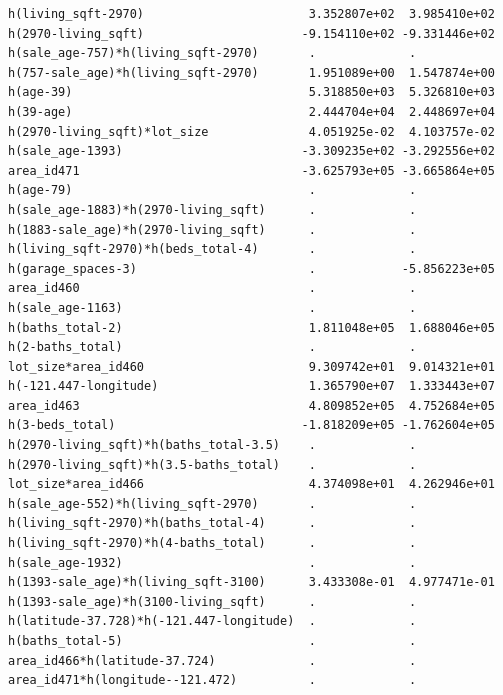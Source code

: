 \documentclass[
]{article}
\begin{document}
\begin{verbatim}
h(living_sqft-2970)                       3.352807e+02  3.985410e+02
h(2970-living_sqft)                      -9.154110e+02 -9.331446e+02
h(sale_age-757)*h(living_sqft-2970)       .             .           
h(757-sale_age)*h(living_sqft-2970)       1.951089e+00  1.547874e+00
h(age-39)                                 5.318850e+03  5.326810e+03
h(39-age)                                 2.444704e+04  2.448697e+04
h(2970-living_sqft)*lot_size              4.051925e-02  4.103757e-02
h(sale_age-1393)                         -3.309235e+02 -3.292556e+02
area_id471                               -3.625793e+05 -3.665864e+05
h(age-79)                                 .             .           
h(sale_age-1883)*h(2970-living_sqft)      .             .           
h(1883-sale_age)*h(2970-living_sqft)      .             .           
h(living_sqft-2970)*h(beds_total-4)       .             .           
h(garage_spaces-3)                        .            -5.856223e+05
area_id460                                .             .           
h(sale_age-1163)                          .             .           
h(baths_total-2)                          1.811048e+05  1.688046e+05
h(2-baths_total)                          .             .           
lot_size*area_id460                       9.309742e+01  9.014321e+01
h(-121.447-longitude)                     1.365790e+07  1.333443e+07
area_id463                                4.809852e+05  4.752684e+05
h(3-beds_total)                          -1.818209e+05 -1.762604e+05
h(2970-living_sqft)*h(baths_total-3.5)    .             .           
h(2970-living_sqft)*h(3.5-baths_total)    .             .           
lot_size*area_id466                       4.374098e+01  4.262946e+01
h(sale_age-552)*h(living_sqft-2970)       .             .           
h(living_sqft-2970)*h(baths_total-4)      .             .           
h(living_sqft-2970)*h(4-baths_total)      .             .           
h(sale_age-1932)                          .             .           
h(1393-sale_age)*h(living_sqft-3100)      3.433308e-01  4.977471e-01
h(1393-sale_age)*h(3100-living_sqft)      .             .           
h(latitude-37.728)*h(-121.447-longitude)  .             .           
h(baths_total-5)                          .             .           
area_id466*h(latitude-37.724)             .             .           
area_id471*h(longitude--121.472)          .             .           
                                                                    

\end{verbatim}
\end{document}
